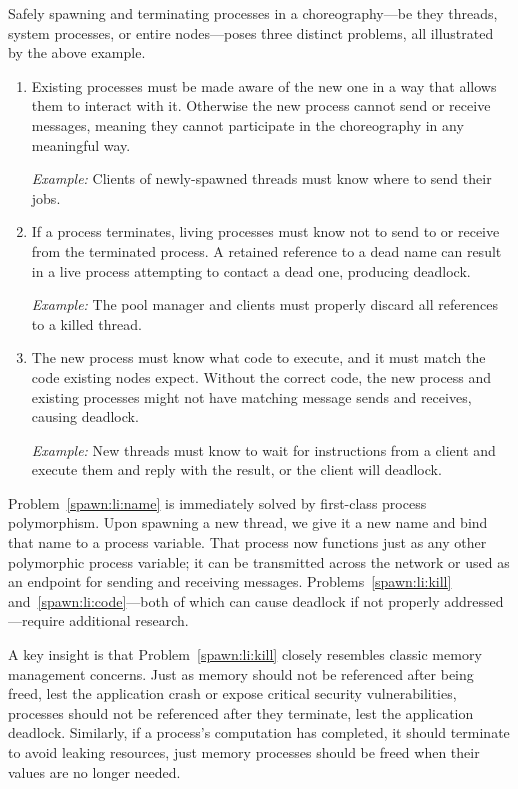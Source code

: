 Safely spawning and terminating processes in a choreography---be they threads, system processes, or entire nodes---poses three distinct problems,
all illustrated by the above example.
\begin{enumerate}
  \item\label{spawn:li:name}
    Existing processes must be made aware of the new one in a way that allows them to interact with it.
    Otherwise the new process cannot send or receive messages, meaning they cannot participate in the choreography in any meaningful way.

    \textit{Example:} Clients of newly-spawned threads must know where to send their jobs.

  \item\label{spawn:li:kill}
    If a process terminates, living processes must know not to send to or receive from the terminated process.
    A retained reference to a dead name can result in a live process attempting to contact a dead one, producing deadlock.

    \textit{Example:} The pool manager and clients must properly discard all references to a killed thread.

  \item\label{spawn:li:code}
    The new process must know what code to execute, and it must match the code existing nodes expect.
    Without the correct code, the new process and existing processes might not have matching message sends and receives, causing deadlock.

    \textit{Example:} New threads must know to wait for instructions from a client and execute them
    and reply with the result, or the client will deadlock.
\end{enumerate}

Problem~\ref{spawn:li:name} is immediately solved by first-class process polymorphism.
Upon spawning a new thread, we give it a new name and bind that name to a process variable.
That process now functions just as any other polymorphic process variable;
it can be transmitted across the network or used as an endpoint for sending and receiving messages.
Problems~\ref{spawn:li:kill} and~\ref{spawn:li:code}---both of which can cause deadlock if not properly addressed---require additional research.

A key insight is that Problem~\ref{spawn:li:kill} closely resembles classic memory management concerns.
Just as memory should not be referenced after being freed, lest the application crash or expose critical security vulnerabilities,
processes should not be referenced after they terminate, lest the application deadlock.
Similarly, if a process's computation has completed, it should terminate to avoid leaking resources,
just memory processes should be freed when their values are no longer needed.

